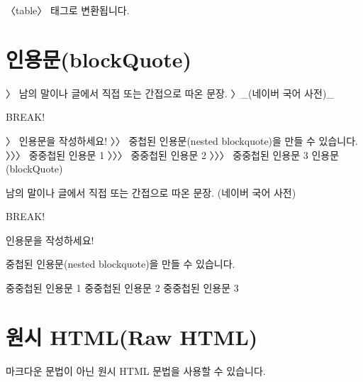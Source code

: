 \documentclass[12pt, a4paper, oneside]{book}
\let\stdsection\section
\renewcommand\section{\newpage\stdsection}
\begin{document}
					〈table〉 태그로 변환됩니다.
%					
%					
				
				\section{인용문(blockQuote)}
			
					〉 남의 말이나 글에서 직접 또는 간접으로 따온 문장.
					〉\_(네이버 국어 사전)\_
					
					BREAK!
					
					〉 인용문을 작성하세요!
					〉〉 중첩된 인용문(nested blockquote)을 만들 수 있습니다.
					〉〉〉 중중첩된 인용문 1
					〉〉〉 중중첩된 인용문 2
					〉〉〉 중중첩된 인용문 3
					인용문(blockQuote)
					
					남의 말이나 글에서 직접 또는 간접으로 따온 문장.
					(네이버 국어 사전)
					
					BREAK!
					
					인용문을 작성하세요!
					
					중첩된 인용문(nested blockquote)을 만들 수 있습니다.
					
					중중첩된 인용문 1
					중중첩된 인용문 2
					중중첩된 인용문 3
					
				\section{원시 HTML(Raw HTML)}
					마크다운 문법이 아닌 원시 HTML 문법을 사용할 수 있습니다.
					
\end{document}
